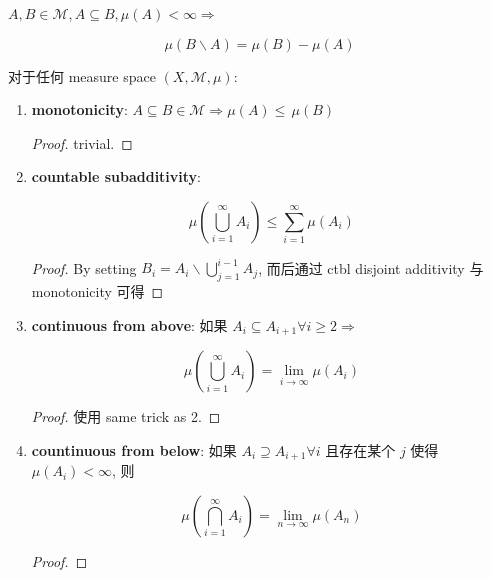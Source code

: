 \begin{corollary}

\(A,B \in \mathcal{M},A \subseteq B,\mu(A) < \infty\Longrightarrow\)

\[\mu(B\backslash A) = \mu(B) - \mu(A)\]

\end{corollary}

\begin{theorem}{}

对于任何 measure space \((X,\mathcal{M},\mu)\):

\begin{enumerate}
\item
  \textbf{monotonicity}: \(A \subseteq B \in \mathcal{M}\Longrightarrow\mu(A) \leq \,\mu(B)\)

  \begin{proof}

  trivial.

  \end{proof}
\item
  \textbf{countable subadditivity}:

  \[\mu(\bigcup\limits_{i = 1}^{\infty}A_{i}) \leq \sum\limits_{i = 1}^{\infty}\mu(A_{i})\]

  \begin{proof}

  By setting \(B_{i} = A_{i}\backslash\bigcup_{j = 1}^{i - 1}A_{j}\), 而后通过 ctbl disjoint additivity 与 monotonicity 可得

  \end{proof}
\item
  \textbf{continuous from above}: 如果 \(A_{i} \subseteq A_{i + 1}\forall i \geq 2\Longrightarrow\)

  \[\mu(\bigcup\limits_{i = 1}^{\infty}A_{i}) = \lim\limits_{i\rightarrow\infty}\mu(A_{i})\]

  \begin{proof}

  使用 same trick as 2.

  \end{proof}
\item
  \textbf{countinuous from below}: 如果 \(A_{i} \supseteq A_{i + 1}\forall i\) 且存在某个 \(j\) 使得 \(\mu(A_{i}) < \infty\), 则

  \[\mu(\bigcap\limits_{i = 1}^{\infty}A_{i}) = \lim\limits_{n\rightarrow\infty}\mu(A_{n})\]

  \begin{proof}


\end{proof}
\end{enumerate}
\end{theorem}

